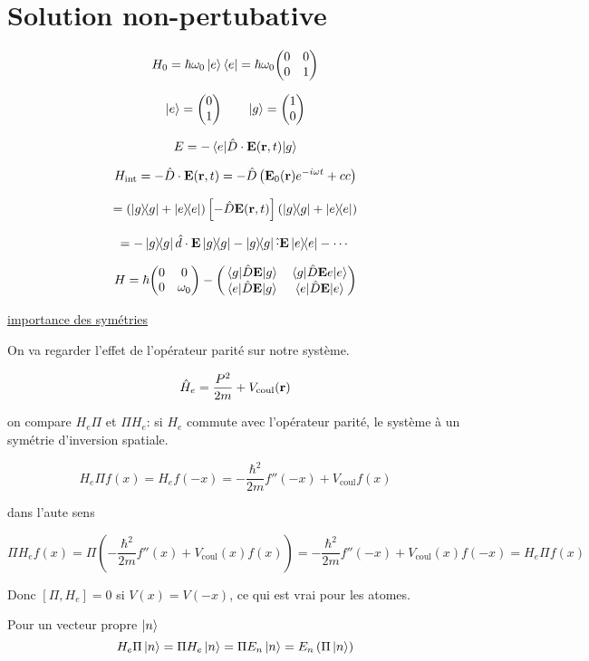 


\section*{Solution non-pertubative}


$$H_0 = \hbar \omega_0 \ket{e}\bra{e} = \hbar\omega_0 \mqty(0& 0\\ 0 & 1)$$ 

\begin{tcolorbox}[title=]
	$$\ket{e}= \mqty(0\\1) \qquad \ket{g} = \mqty(1\\0)$$  
\end{tcolorbox}

$$E = - \mel{e}{\hat D \cdot \vb{E}(\vb{r},t)}{g}$$ 

$$H_{\text{int}} = - \hat D \cdot \vb{E} (\vb{r}, t) = - \hat D \left( \vb{E}_0(\vb{r})e^{-i\omega t} +cc \right) $$ 

$$= \left( \op{g} + \op{e} \right) \left[ -\hat D \vb{E} (\vb{r},t) \right] \left( \op{g} + \op{e} \right)  $$ 

$$= - \op{g} \hat d \cdot \vb{E} \op{g} - \op{g} \hat \cdot \vb{E} \op{e} - \dotsb$$ 


$$H = \hbar \mqty(0 & 0 \\ 0 &\omega_{0}) - \mqty(\mel{g}{\hat D \vb{E}}{g} & \mel{g}{\hat D \vb{E}{e}}{e}\\ \mel{e}{\hat D \vb{E}}{g} &\mel{e}{\hat D \vb{E}}{e})$$ 


\underline{importance des symétries} 

On va regarder l'effet de l'opérateur parité sur notre système.

$$\hat H_e = \frac{P^{2}}{2m} + V_{\text{coul}}(\vb{r}) $$ 

on compare $H_e \Pi$ et $\Pi H_e$: si $H_e$ commute avec l'opérateur parité, le système à un symétrie d'inversion spatiale. 

$$H_e \Pi f(x) = H_e f(-x) = - \frac{\hbar^{2}}{2m} f''(-x) + V_{\text{coul}} f(x) $$ 

dans l'aute sens

$$\Pi H_e f(x) = \Pi \left( -\frac{\hbar^{2}}{2m} f''(x) + V_{\text{coul}}(x) f(x)  \right) = -\frac{\hbar^{2}}{2m} f''(-x) + V_{\text{coul}} (x) f(-x) = H_e \Pi f(x)   $$ 

Donc $[\Pi, H_e] =0$ si $V(x)=V(-x)$, ce qui est vrai pour les atomes. 

Pour un vecteur propre $\ket{n}$ 
$$H_e \Pi \ket{n} = \Pi H_e \ket{n} = \Pi E_n \ket{n} = E_n \left( \Pi \ket{n} \right) $$ 

